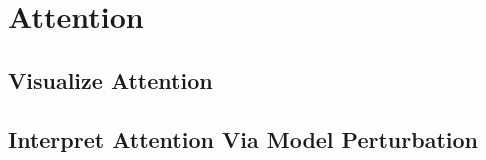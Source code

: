 \section{Attention}

\subsection{Visualize Attention}

\subsection{Interpret Attention Via Model Perturbation}
